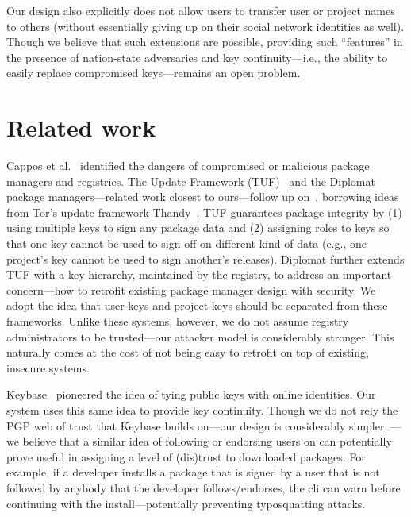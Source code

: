 Our design also explicitly does not allow users to transfer user or project
names to others (without essentially giving up on their social network identities as well).
%
Though we believe that such extensions are possible, providing such
``features'' in the presence of nation-state adversaries and key
continuity---i.e., the ability to easily replace compromised keys---remains an
open problem.


\section{Related work}
\label{sec:related}

%
Cappos et al.~\cite{cappos:look} identified the dangers of compromised
or malicious package managers and registries.
%
The Update Framework (TUF)~\cite{samuel2010survivable} and the
Diplomat~\cite{kuppusamy2016diplomat} package managers---related work closest to
ours---follow up on~\cite{cappos:look}, borrowing ideas from Tor's update
framework Thandy~\cite{thandy}.
%
TUF guarantees package integrity by (1) using multiple keys
to sign any package data and (2) assigning roles to keys so that one key cannot
be used to sign off on different kind of data (e.g., one project's key cannot
be used to sign another's releases).
%
Diplomat further extends TUF with a key hierarchy, maintained by the registry,
to address an important concern---how to retrofit existing package manager design with
security.
%
We adopt the idea that user keys and project keys should be separated from
these frameworks.
%
Unlike these systems, however, we do not assume registry administrators to be
trusted---our attacker model is considerably stronger.
%
This naturally comes at the cost of not being easy to retrofit on top of
existing, insecure systems.

Keybase~\cite{keybase} pioneered the idea of tying public keys with online
identities.
%
Our system uses this same idea to provide key continuity.
%
Though we do not rely the PGP web of trust that Keybase builds on---our design
is considerably simpler~\cite{openbsd}---we believe that a similar idea of
following or endorsing users on \spam can potentially prove useful in assigning
a level of (dis)trust to downloaded packages.
%
For example, if a developer installs a package that is signed by a user that is
not followed by anybody that the developer follows/endorses, the \spam cli can
warn before continuing with the install---potentially preventing typosquatting
attacks.

